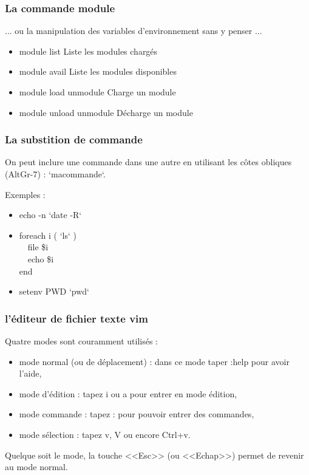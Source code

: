 \documentclass[handout,10pt]{beamer}
\begin{document}
\frame
{
    \frametitle{La commande module}

    ... ou la manipulation des variables d'environnement sans y penser ...

    \begin{itemize}
        \item {\ttfamily module list} Liste les modules chargés
        \item {\ttfamily module avail} Liste les modules disponibles
        \item {\ttfamily module load unmodule} Charge un module
        \item {\ttfamily module unload unmodule} Décharge un module
    \end{itemize}
}


\frame
{
    \frametitle{La substition de commande}

    On peut inclure une commande dans une autre en utilisant les côtes obliques (AltGr-7) : `macommande`.

    Exemples :

    \begin{itemize}
        \item {\ttfamily echo -n `date -R`}
        \item {\ttfamily foreach i ( `ls` ) }\\ {\ttfamily ~~file \$i} \\ {\ttfamily ~~echo \$i} \\ {\ttfamily end}
        \item {\ttfamily setenv PWD `pwd`}
    \end{itemize}
}


\frame
{
    \frametitle{l'éditeur de fichier texte vim}

    Quatre modes sont couramment utilisés :

    \begin{itemize}
        \item mode normal (ou de déplacement) : dans ce mode taper {\ttfamily :help} pour avoir l'aide,
        \item mode d'édition : tapez {\ttfamily i} ou {\ttfamily a} pour entrer en mode édition, 
        \item mode commande : tapez {\ttfamily :} pour pouvoir entrer des commandes,
        \item mode sélection : tapez {\ttfamily v}, {\ttfamily V} ou encore {\ttfamily Ctrl+v}.
    \end{itemize}

    Quelque soit le mode, la touche <<Esc>> (ou <<Echap>>) permet de revenir au mode normal.

}
\end{document}
